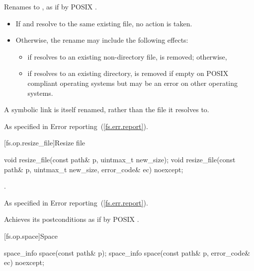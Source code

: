 \begin{itemdescr}
\pnum
\effects Renames  to , as if by
  POSIX .
\enternote
\begin{itemize}
\item If  and  resolve to the same existing file,
   no action is taken.
\item Otherwise, the rename may include the following effects:
\begin{itemize}
\item if  resolves to an existing non-directory file,
     is removed; otherwise,
\item if  resolves to an existing directory,
     is removed if empty on POSIX compliant operating systems
    but may be an error on other operating systems.
\end{itemize}
\end{itemize}
A symbolic link is itself renamed, rather than the file it resolves to.
\exitnote

\pnum
\throws As specified in Error reporting~(\ref{fs.err.report}).
\end{itemdescr}


[fs.op.resize_file]{Resize file}

\begin{itemdecl}
void resize_file(const path& p, uintmax_t new_size);
void resize_file(const path& p, uintmax_t new_size, error_code& ec) noexcept;
\end{itemdecl}

\begin{itemdescr}
\pnum
\postcondition {}.

\pnum
\throws As specified in Error reporting~(\ref{fs.err.report}).

\pnum
\remarks Achieves its postconditions as if by POSIX .
\end{itemdescr}


[fs.op.space]{Space}

\begin{itemdecl}
space_info space(const path& p);
space_info space(const path& p, error_code& ec) noexcept;
\end{itemdecl}

